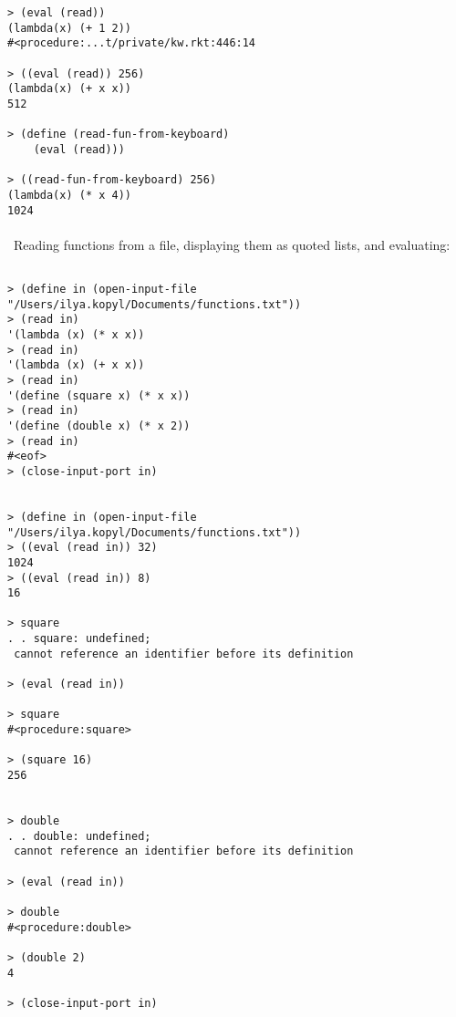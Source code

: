 \documentclass{article}
\begin{document}
\begin{verbatim} 
> (eval (read))
(lambda(x) (+ 1 2))
#<procedure:...t/private/kw.rkt:446:14

> ((eval (read)) 256)
(lambda(x) (+ x x))
512

> (define (read-fun-from-keyboard)
    (eval (read)))

> ((read-fun-from-keyboard) 256)
(lambda(x) (* x 4))
1024
\end{verbatim}
\paragraph{}\
Reading functions from a file, displaying them as quoted lists, and evaluating:

\begin{verbatim} 

> (define in (open-input-file "/Users/ilya.kopyl/Documents/functions.txt"))
> (read in)
'(lambda (x) (* x x))
> (read in)
'(lambda (x) (+ x x))
> (read in)
'(define (square x) (* x x))
> (read in)
'(define (double x) (* x 2))
> (read in)
#<eof>
> (close-input-port in)


> (define in (open-input-file "/Users/ilya.kopyl/Documents/functions.txt"))
> ((eval (read in)) 32)
1024
> ((eval (read in)) 8)
16

> square
. . square: undefined;
 cannot reference an identifier before its definition

> (eval (read in))

> square
#<procedure:square>

> (square 16)
256


> double
. . double: undefined;
 cannot reference an identifier before its definition

> (eval (read in))

> double
#<procedure:double>

> (double 2)
4

> (close-input-port in)
\end{verbatim}
\paragraph{}\
\end{document}
